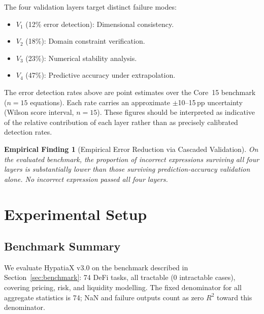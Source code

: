 \documentclass[twoside,11pt]{article}
\newcommand{\Rsq}{R^{2}}
\newtheorem{finding}{Empirical Finding}
\begin{document}
The four validation layers target distinct failure modes:

\begin{itemize}
\item $V_1$ (12\% error detection): Dimensional consistency.
\item $V_2$ (18\%): Domain constraint verification.
\item $V_3$ (23\%): Numerical stability analysis.
\item $V_4$ (47\%): Predictive accuracy under extrapolation.
\end{itemize}

\begin{remark}
\label{rem:validation_ci}
The error detection rates above are point estimates over the Core~15 benchmark
($n=15$ equations).  Each rate carries an approximate $\pm$10--15\,pp
uncertainty (Wilson score interval, $n=15$).  These figures should be
interpreted as indicative of the relative contribution of each layer rather
than as precisely calibrated detection rates.
\end{remark}

\begin{finding}[Empirical Error Reduction via Cascaded Validation]
\label{prop:validation_reduction}
On the evaluated benchmark, the proportion of incorrect expressions surviving
all four layers is substantially lower than those surviving prediction-accuracy
validation alone.  No incorrect expression passed all four layers.
\end{finding}

\section{Experimental Setup}
\label{sec:setup}

\subsection{Benchmark Summary}\label{subsec:benchmark-summary}
\label{sec:setup_summary}

We evaluate HypatiaX v3.0 on the benchmark described in Section~\ref{sec:benchmark}:
74 DeFi tasks, all tractable (0 intractable cases), covering pricing, risk, and
liquidity modelling.  The fixed denominator for all aggregate statistics is 74;
NaN and failure outputs count as zero $\Rsq$ toward this denominator.
\end{document}

